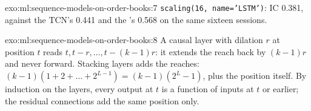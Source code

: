 \begin{solution}{exo:ml:sequence-models-on-order-books:7}
\texttt{scaling(16, name='LSTM')}: IC 0.381, against the TCN's 0.441 and the 's 0.568 on the same
sixteen sessions.
\end{solution}

\begin{solution}{exo:ml:sequence-models-on-order-books:8}
A causal layer with dilation $r$ at position $t$ reads $t, t - r,\dots, t - (k-1)r$: it extends the reach back by
$(k-1)r$ and never forward. Stacking layers adds the reaches: $(k-1)(1 + 2 + \dots + 2^{L-1}) = (k-1)(2^L - 1)$, plus the
position itself. By induction on the layers, every output at $t$ is a function of inputs at $t$ or earlier; the residual
connections add the same position only.
\end{solution}

